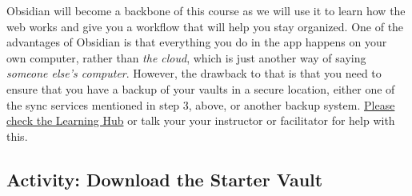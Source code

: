 \documentclass[
]{book}
\theoremstyle{definition}
\theoremstyle{definition}
\theoremstyle{definition}
\theoremstyle{definition}
\theoremstyle{remark}
\begin{document}
Obsidian will become a backbone of this course as we will use it to learn how the web works and give you a workflow that will help you stay organized. One of the advantages of Obsidian is that everything you do in the app happens on your own computer, rather than \emph{the cloud}, which is just another way of saying \emph{someone else's computer}. However, the drawback to that is that you need to ensure that you have a backup of your vaults in a secure location, either one of the sync services mentioned in step 3, above, or another backup system. \href{https://twu.discourse.group/c/ldrs101/10}{Please check the Learning Hub} or talk your your instructor or facilitator for help with this.

\hypertarget{activity-download-the-starter-vault}{%
\subsection*{Activity: Download the Starter Vault}\label{activity-download-the-starter-vault}}
\end{document}
